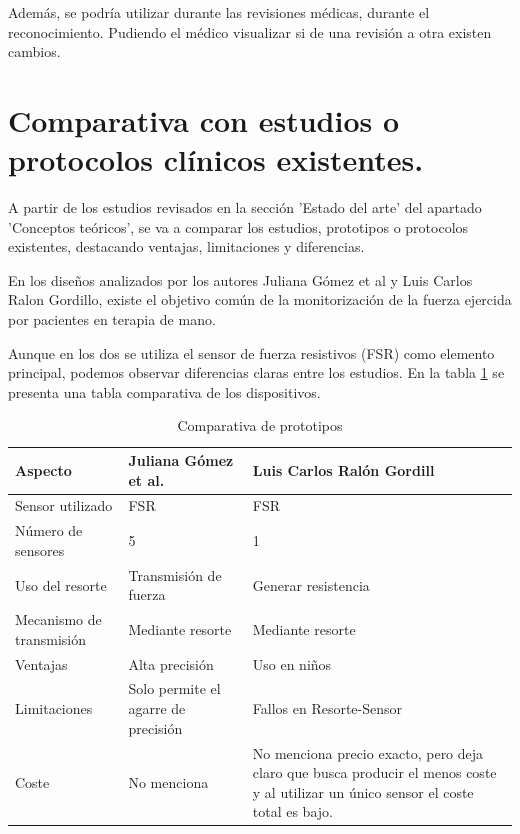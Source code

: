 Además, se podría utilizar durante las revisiones médicas, durante el reconocimiento. Pudiendo el médico visualizar si de una revisión a otra existen cambios. 

\section{ Comparativa con estudios o protocolos clínicos existentes.}

A partir de los estudios revisados en la sección 'Estado del arte' del apartado 'Conceptos teóricos', se va a comparar los estudios, prototipos o protocolos existentes, destacando ventajas, limitaciones y diferencias.

En los diseños analizados por los autores Juliana Gómez et al y Luis Carlos Ralon Gordillo, existe el objetivo común de la monitorización de la fuerza ejercida por pacientes en terapia de mano. 

Aunque en los dos se utiliza el sensor de fuerza resistivos (FSR) como elemento principal, podemos observar diferencias claras entre los estudios. En la tabla \ref{tab:comparativa_prototipos} se presenta una tabla comparativa de los dispositivos.
\begin{table}[h]
    \begin{tabular}{|p{3.5cm}|p{5cm}|p{6cm}|}
    \hline
    \rowcolor[HTML]{BFBFBF} 
    \textbf{Aspecto} & \textbf{Juliana Gómez et al.} & \textbf{Luis Carlos Ralón Gordill} \\ \hline
    Sensor utilizado & FSR & FSR  \\ \hline
    Número de sensores & 5 & 1 \\ \hline
    Uso del resorte & Transmisión de fuerza & Generar resistencia \\ \hline
    Mecanismo de transmisión & Mediante resorte & Mediante resorte\\ \hline
    Ventajas & Alta precisión & Uso en niños \\ \hline
    Limitaciones & Solo permite el agarre de precisión & Fallos en Resorte-Sensor  \\ \hline
    Coste  & No menciona & No menciona precio exacto, pero deja claro que busca producir el menos coste y al utilizar un único sensor el coste total es bajo.  \\ \hline
    \end{tabular}
    \caption{Comparativa de prototipos}
    \label{tab:comparativa_prototipos}
\end{table}

